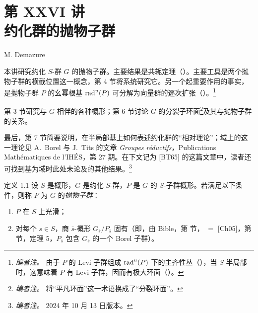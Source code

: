 \chapter*{第 XXVI 讲\\约化群的抛物子群}
\begin{center}
\large M. Demazure
\end{center}
\medskip
本讲研究约化 \(S\)-群 \(G\) 的抛物子群。主要结果是共轭定理（）。主要工具是两个抛物子群的横截位置这一概念，第 4 节将系统研究它。另一个起重要作用的事实，是抛物子群 \(P\) 的幺幂根基 \(\operatorname{rad}^{u}(P)\) 可分解为向量群的逐次扩张（）。\footnote{\emph{编者注。} 由于 \(P\) 的 Levi 子群组成 \(\operatorname{rad}^{u}(P)\) 下的主齐性丛（），当 \(S\) 半局部时，这意味着 \(P\) 有 Levi 子群，因而有极大环面（）。}

第 3 节研究与 \(G\) 相伴的各种概形；第 6 节讨论 \(G\) 的分裂子环面\footnote{\emph{编者注。} 将“平凡环面”这一术语换成了“分裂环面”。}及其与抛物子群的关系。

最后，第 7 节简要说明，在半局部基上如何表述约化群的“相对理论”；域上的这一理论见 A.~Borel 与 J.~Tits 的文章 \emph{Groupes réductifs}，Publications Mathématiques de l'IHÉS，第 27 期。在下文记为 [BT65] 的这篇文章中，读者还可找到基为域时此处未论及的其他结果。\footnote{\emph{编者注。} 2024 年 10 月 13 日版本。}

\begin{sgastatement}{定义 1.1}
设 \(S\) 是概形，\(G\) 是约化 \(S\)-群，\(P\) 是 \(G\) 的 \(S\)-子群概形。若满足以下条件，则称 \(P\) 为 \(G\) 的\emph{抛物子群}：
\begin{enumerate}[label=\textup{(\roman*)}]
\item \(P\) 在 \(S\) 上光滑；
\item 对每个 \(s\in S\)，商 \(\bar s\)-概形 \(G_{\bar s}/P_{\bar s}\) 固有（即，由 Bible，第  节， \(=\) [Ch05]，第  节，定理 5，\(P_{\bar s}\) 包含 \(G_{\bar s}\) 的一个 Borel 子群）。
\end{enumerate}
\end{sgastatement}

